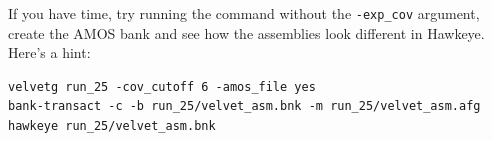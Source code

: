 \begin{bonus}
If you have time, try running the  command without the
\texttt{-exp\_cov} argument, create the AMOS bank and see how the assemblies
look different in Hawkeye. Here's a hint:
\begin{lstlisting}
velvetg run_25 -cov_cutoff 6 -amos_file yes
bank-transact -c -b run_25/velvet_asm.bnk -m run_25/velvet_asm.afg
hawkeye run_25/velvet_asm.bnk
\end{lstlisting}

\end{bonus}

\begin{advanced}

\end{advanced}